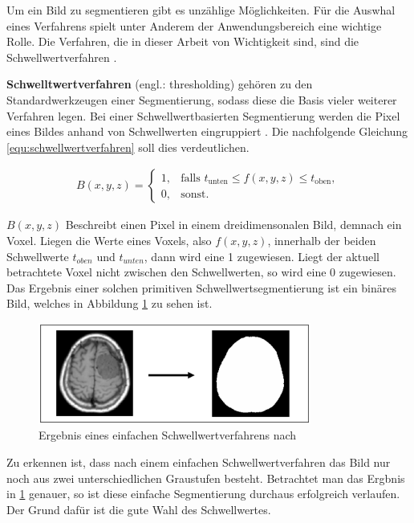 Um ein Bild zu segmentieren gibt es unzählige Möglichkeiten. Für die Auswhal
eines Verfahrens spielt unter Anderem der Anwendungsbereich eine wichtige Rolle.
Die Verfahren, die in dieser Arbeit von Wichtigkeit sind, sind die Schwellwertverfahren
\citep[vgl.][S.~361]{lehmann2013bildverarbeitung}.

\pagebreak

\textbf{Schwelltwertverfahren} (engl.: thresholding) gehören zu den
Standardwerkzeugen einer Segmentierung, sodass diese die Basis vieler weiterer Verfahren
legen. Bei einer Schwellwertbasierten Segmentierung werden die Pixel eines
Bildes anhand von Schwellwerten eingruppiert \citep[vgl.][S.~96]{handels2000}.
Die nachfolgende Gleichung \ref{equ:schwellwertverfahren} soll dies
verdeutlichen.

\begin{align}
	\label{equ:schwellwertverfahren}B(x, y, z) = \begin{cases}1,&\text{falls }t_{\text{unten}}\leq f(x, y, z) \leq t_{\text{oben}}, \\ 0,&\text{sonst}.\end{cases}
\end{align}

$B(x, y, z)$ Beschreibt einen Pixel in einem dreidimensonalen Bild, demnach ein
Voxel. Liegen die Werte eines Voxels, also $f(x, y, z)$, innerhalb der beiden Schwellwerte
$t_{oben}$ und $t_{unten}$, dann wird eine 1 zugewiesen. Liegt der aktuell betrachtete
Voxel nicht zwischen den Schwellwerten, so wird eine 0 zugewiesen. Das Ergebnis einer
solchen primitiven Schwellwertsegmentierung ist ein binäres Bild, welches in
Abbildung \ref{fig:binäres_schwellwertverfahren} zu sehen ist.

\begin{figure}[h]
	\centering
	\includegraphics[width=0.8\textwidth]{img/beispiel_schwellwertverfahren.jpg}
	\caption{Ergebnis eines einfachen Schwellwertverfahrens nach \citet[S.~96]{handels2000}}
	\label{fig:binäres_schwellwertverfahren}
\end{figure}

Zu erkennen ist, dass nach einem einfachen Schwellwertverfahren das Bild nur
noch aus zwei unterschiedlichen Graustufen besteht. Betrachtet man das Ergbnis in
\ref{fig:binäres_schwellwertverfahren} genauer, so ist diese einfache
Segmentierung durchaus erfolgreich verlaufen. Der Grund dafür ist die gute Wahl des
Schwellwertes.

